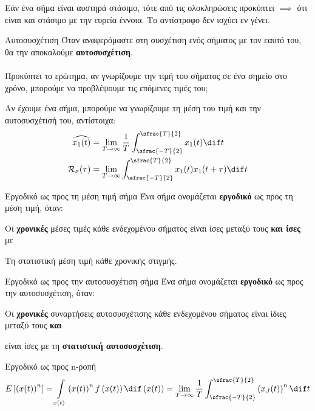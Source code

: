 \documentclass[11pt,a4paper,notitlepage,fleqn,final]{article}
\begin{document}
Εάν ένα σήμα είναι αυστηρά στάσιμο, τότε από τις ολοκληρώσεις προκύπτει
\( \implies \) ότι είναι και στάσιμο με την ευρεία έννοια. Το
αντίστροφο δεν ισχύει εν γένει.

\begin{defn}{Αυτοσυσχέτιση}{}
	Όταν αναφερόμαστε στη συσχέτιση ενός σήματος με τον εαυτό του,
	θα την αποκαλούμε \textbf{αυτοσυσχέτιση}.
\end{defn}

\paragraph{}
Προκύπτει το ερώτημα, αν γνωρίζουμε την τιμή του σήματος σε ένα
σημείο στο χρόνο, μπορούμε να προβλέψουμε τις επόμενες τιμές του;

Αν έχουμε ένα σήμα, μπορούμε να γνωρίζουμε τη μέση του τιμή και την
αυτοσυσχέτισή του, αντίστοιχα:
\begin{align*}
	\widehat{x_1(t)} &= \lim_{T\to \infty} \frac{1}{T}
	\int_{\sfrac{-T}{2} }^{\sfrac{T}{2} } x_1(t)\dif t
	\\
	\mathcal{R}_x(\tau) &= \lim_{T\to \infty}
	\int_{\sfrac{-T}{2} }^{\sfrac{T}{2} } x_1(t)x_1(t+\tau)\dif t
\end{align*}

\begin{defn}{Εργοδικό ως προς τη μέση τιμή σήμα}{}
	Ένα σήμα ονομάζεται \textbf{εργοδικό} ως προς τη μέση τιμή, όταν:
	\begin{enumparen}
		\item Οι \textbf{χρονικές} μέσες τιμές κάθε ενδεχομένου σήματος
		είναι ίσες μεταξύ τους \textbf{και ίσες} με
		\item Τη στατιστική μέση τιμή κάθε χρονικής στιγμής.
	\end{enumparen}
\end{defn}

\begin{defn}{Εργοδικό ως προς την αυτοσυσχέτιση σήμα}{}
	Ένα σήμα ονομάζεται \textbf{εργοδικό} ως προς την αυτοσυσχέτιση,
	όταν:
	\begin{enumparen}
		\item Οι \textbf{χρονικές} συναρτήσεις αυτοσυσχέτισης
		κάθε ενδεχομένου σήματος
		είναι ίδιες μεταξύ τους \textbf{και}
		\item είναι ίσες με τη \textbf{στατιστική αυτοσυσχέτιση}.
	\end{enumparen}
\end{defn}

\begin{defn}{Εργοδικό ως προς n-ροπή}{}
	\[
	E\left[\left(x(t)\right)^n\right] =
	\int\limits_{x(t)} \left(x(t)\right)^n
	f\left(x(t)\right) \dif\left(x(t)\right)
	= \lim_{T\to \infty} \frac{1}{T}
	\int_{\sfrac{-T}{2} }^{\sfrac{T}{2} }
	\left(x_J(t)\right)^n \dif t
	\]
\end{defn}
\end{document}
